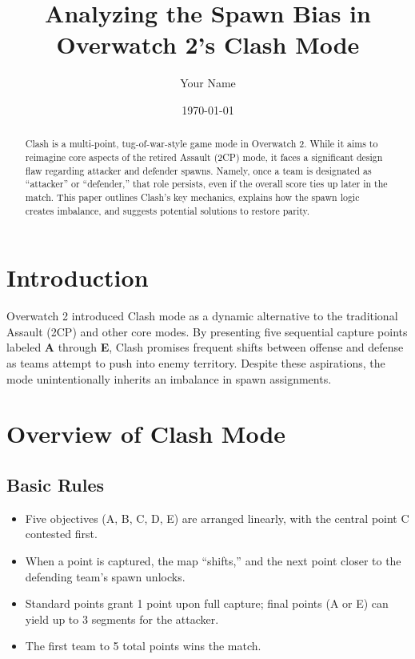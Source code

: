 \documentclass[12pt]{article}
\title{\textbf{Analyzing the Spawn Bias in Overwatch 2's Clash Mode}}
\author{Your Name}
\date{\today}
\begin{document}
\maketitle

\begin{abstract}
Clash is a multi-point, tug-of-war-style game mode in Overwatch 2. 
While it aims to reimagine core aspects of the retired Assault (2CP) mode, 
it faces a significant design flaw regarding attacker and defender spawns. 
Namely, once a team is designated as ``attacker'' or ``defender,'' 
that role persists, even if the overall score ties up later in the match. 
This paper outlines Clash’s key mechanics, explains how the spawn logic 
creates imbalance, and suggests potential solutions to restore parity.
\end{abstract}

\tableofcontents

\section{Introduction}
Overwatch 2 introduced Clash mode as a dynamic alternative to the traditional Assault 
(2CP) and other core modes. By presenting five sequential capture points labeled 
\textbf{A} through \textbf{E}, Clash promises frequent shifts between offense and defense 
as teams attempt to push into enemy territory. Despite these aspirations, the mode 
unintentionally inherits an imbalance in spawn assignments.

\section{Overview of Clash Mode}

\subsection{Basic Rules}
\begin{itemize}
    \item Five objectives (A, B, C, D, E) are arranged linearly, with the central point C 
    contested first.
    \item When a point is captured, the map “shifts,” and the next point closer to the 
    defending team's spawn unlocks.
    \item Standard points grant 1 point upon full capture; final points (A or E) can 
    yield up to 3 segments for the attacker.
    \item The first team to 5 total points wins the match.
\end{itemize}
\end{document}
